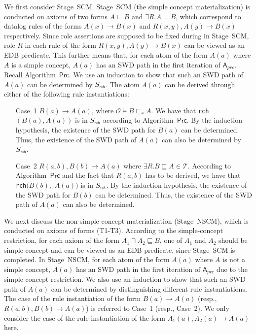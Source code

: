 We first consider Stage~SCM.
Stage~SCM (the simple concept materialization) is conducted on axioms of two forms $A\sqsubseteq B$
and $\exists R.A\sqsubseteq B$, which correspond to datalog rules of the forms $A(x)\rightarrow B(x)$
and $R(x,y),A(y)\rightarrow B(x)$ respectively. Since role assertions are supposed to be fixed
during in Stage~SCM, role $R$ in each rule of the form $R(x,y),A(y)\rightarrow B(x)$
can be viewed as an EDB predicate. This further means that,
for each atom of the form $A(a)$ where $A$ is a simple concept,
$A(a)$ has an SWD path in the first iteration of $\mathsf{A}_{prc}$.
Recall Algorithm~$\mathsf{Prc}$. We use an induction to show that
such an SWD path of $A(a)$ can be determined by $S_{\textit{\tiny rch}}$.
The atom $A(a)$ can be derived through either of the following rule instantiations:

\begin{enumerate}[leftmargin=12ex]
\item[Case~1] $B(a)\rightarrow A(a)$, where $\mathcal{O}\models B\sqsubseteq_* A$. We have
    that \texttt{rch}$(B(a),A(a))$ is in $S_{\textit{\tiny rch}}$ according to Algorithm~$\mathsf{Prc}$.
    By the induction hypothesis, the existence of the SWD path for $B(a)$ can be determined.
    Thus, the existence of the SWD path of $A(a)$ can also be determined by $S_{\textit{\tiny rch}}$.

\item[Case~2] $R(a,b),B(b)\rightarrow A(a)$ where $\exists R.B\sqsubseteq A\in\mathcal{T}$.
    According to Algorithm~$\mathsf{Prc}$ and the fact that $R(a,b)$ has to be derived,
    we have that \texttt{rch}$(B(b),$ $A(a))$ is in $S_{\textit{\tiny rch}}$.
    By the induction hypothesis, the existence of the SWD path for $B(b)$ can be determined.
    Thus, the existence of the SWD path of $A(a)$ can also be determined.
\end{enumerate}

We next discuss the non-simple concept materialization (Stage~NSCM), which is conducted on axioms of forms (T1-T3).
According to the simple-concept restriction, for each axiom of the form $A_1\sqcap A_2\sqsubseteq B$,
one of $A_1$ and $A_2$ should be simple concept and can be viewed as an EDB predicate, since Stage~SCM is completed.
In Stage~NSCM, for each atom of the form $A(a)$ where $A$ is not a simple concept,
$A(a)$ has an SWD path in the first iteration of $\mathsf{A}_{prc}$ due to the simple concept restriction.
We also use an induction to show that
such an SWD path of $A(a)$ can be determined by distinguishing different rule instantiations.
The case of the rule instantiation of the form $B(a)\rightarrow A(a)$ (resp., $R(a,b),B(b)\rightarrow A(a)$)
is referred to Case~1 (resp., Case~2). We only consider the case of the rule instantiation of the form $A_1(a),A_2(a)\rightarrow A(a)$
here.


